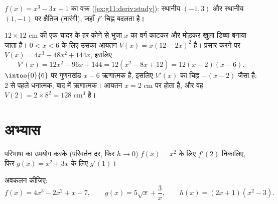 \begin{omfigure}

{\small $f(x) = x^3 - 3x + 1$ का वक्र (\cref{ex:g11:deriv:study}): स्थानीय  $(-1, 3)$ और स्थानीय  $(1, -1)$
पर क्षैतिज  (नारंगी), जहाँ $f'$ चिह्न बदलता है।}
\end{omfigure}

\begin{example}\label{ex:g11:deriv:box}
$12 \times 12$ cm की एक चादर के हर कोने से भुजा $x$ का वर्ग काटकर और मोड़कर खुला
डिब्बा बनाया जाता है। $0 < x < 6$ के लिए उसका आयतन $V(x) = x(12 - 2x)^2$ है। प्रसार करने पर $V(x) = 4x^3 - 48x^2 + 144x$,
इसलिए
\[
V'(x) = 12x^2 - 96x + 144 = 12(x^2 - 8x + 12) = 12(x - 2)(x - 6).
\]
$\intoo{0}{6}$ पर गुणनखंड $x - 6$ ऋणात्मक है, इसलिए $V'(x)$ का चिह्न $-(x-2)$ जैसा है:
$2$ से पहले धनात्मक, बाद में ऋणात्मक। आयतन $x = 2$ cm पर  होता है, और
वह $V(2) = 2 \times 8^2 = 128$ cm$^3$ है।
\end{example}

\section{अभ्यास}

\begin{exercise}[$\star$]\label{exo:g11:deriv:1}
परिभाषा का उपयोग करके (परिवर्तन दर, फिर $h \to 0$) $f(x) = x^2$ के लिए $f'(2)$ निकालिए,
फिर $g(x) = x^2 + 3x$ के लिए $g'(1)$।
\end{exercise}

\begin{exercise}[$\star$]\label{exo:g11:deriv:2}
अवकलन कीजिए:
\[
f(x) = 4x^3 - 2x^2 + x - 7, \qquad
g(x) = 5\sqrt{x} + \frac{3}{x}, \qquad
h(x) = (2x+1)(x^2 - 3) .
\]
\end{exercise}

